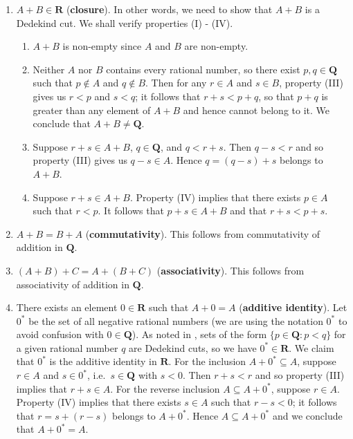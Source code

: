 \documentclass[12pt]{article}
\newcommand{\Q}{\mathbf{Q}}
\newcommand{\R}{\mathbf{R}}
\theoremstyle{definition}
\begin{document}
\begin{enumerate}[label = (A\arabic*)]
    \item \( A + B \in \R \) (\textbf{closure}). In other words, we need to show that \( A + B \) is a Dedekind cut. We shall verify properties (I) - (IV).
    
    \begin{enumerate}[label = (\Roman*)]
        \item \( A + B \) is non-empty since \( A \) and \( B \) are non-empty.
        
        \item Neither \( A \) nor \( B \) contains every rational number, so there exist \( p, q \in \Q \) such that \( p \not\in A \) and \( q \not\in B \). Then for any \( r \in A \) and \( s \in B \), property (III) gives us \( r < p \) and \( s < q \); it follows that \( r + s < p + q \), so that \( p + q \) is greater than any element of \( A + B \) and hence cannot belong to it. We conclude that \( A + B \neq \Q \).
        
        \item Suppose \( r + s \in A + B \), \( q \in \Q \), and \( q < r + s \). Then \( q - s < r \) and so property (III) gives us \( q - s \in A \). Hence \( q = (q - s) + s \) belongs to \( A + B \).
        
        \item Suppose \( r + s \in A + B \). Property (IV) implies that there exists \( p \in A \) such that \( r < p \). It follows that \( p + s \in A + B \) and that \( r + s < p + s \).
    \end{enumerate}
    
    \item \( A + B = B + A \) (\textbf{commutativity}). This follows from commutativity of addition in \( \Q \).
    
    \item \( (A + B) + C = A + (B + C) \) (\textbf{associativity}). This follows from associativity of addition in \( \Q \).
    
    \item There exists an element \( 0 \in \R \) such that \( A + 0 = A \) (\textbf{additive identity}). Let \( 0^* \) be the set of all negative rational numbers (we are using the notation \( 0^* \) to avoid confusion with \( 0 \in \Q \)). As noted in , sets of the form \( \{ p \in \Q : p < q \} \) for a given rational number \( q \) are Dedekind cuts, so we have \( 0^* \in \R \). We claim that \( 0^* \) is the additive identity in \( \R \). For the inclusion \( A + 0^* \subseteq A \), suppose \( r \in A \) and \( s \in 0^* \), i.e.\ \( s \in \Q \) with \( s < 0 \). Then \( r + s < r \) and so property (III) implies that \( r + s \in A \). For the reverse inclusion \( A \subseteq A + 0^* \), suppose \( r \in A \). Property (IV) implies that there exists \( s \in A \) such that \( r - s < 0 \); it follows that \( r = s + (r - s) \) belongs to \( A + 0^* \). Hence \( A \subseteq A + 0^* \) and we conclude that \( A + 0^* = A \).
    

\end{enumerate}
\end{document}
